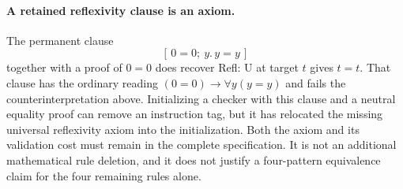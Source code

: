 \paragraph{A retained reflexivity clause is an axiom.}
The permanent clause
\[
 [\,0=0;\ y.\,y=y\,]
\]
together with a proof of $0=0$ does recover Refl: U at target $t$
gives $t=t$. That clause has the ordinary reading
$(0=0)\to\forall y(y=y)$ and fails the counterinterpretation above.
Initializing a checker with this clause and a neutral equality proof
can remove an instruction tag, but it has relocated the missing
universal reflexivity axiom into the initialization. Both the axiom
and its validation cost must remain in the complete specification.
It is not an additional mathematical rule deletion, and it does
not justify a four-pattern equivalence claim for the four remaining
rules alone.

